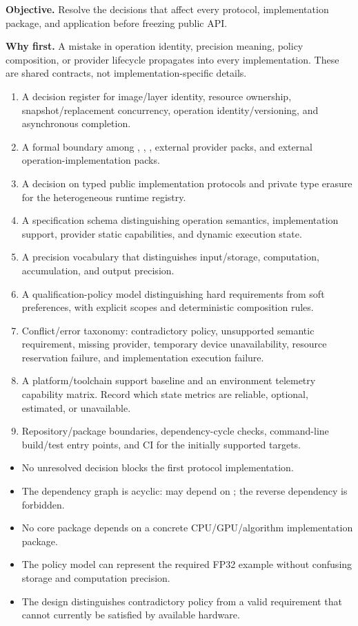 
\textbf{Objective.} Resolve the decisions that affect every protocol, implementation package, and application before freezing public API.

\textbf{Why first.} A mistake in operation identity, precision meaning, policy composition, or provider lifecycle propagates into every implementation. These are shared contracts, not implementation-specific details.

\deliverables
\begin{enumerate}
  \item A decision register for image/layer identity, resource ownership, snapshot/replacement concurrency, operation identity/versioning, and asynchronous completion.
  \item A formal boundary among \IPP{}, \GEP{}, \IPR{}, external provider packs, and external operation-implementation packs.
  \item A decision on typed public implementation protocols and private type erasure for the heterogeneous runtime registry.
  \item A specification schema distinguishing operation semantics, implementation support, provider static capabilities, and dynamic execution state.
  \item A precision vocabulary that distinguishes input/storage, computation, accumulation, and output precision.
  \item A qualification-policy model distinguishing hard requirements from soft preferences, with explicit scopes and deterministic composition rules.
  \item Conflict/error taxonomy: contradictory policy, unsupported semantic requirement, missing provider, temporary device unavailability, resource reservation failure, and implementation execution failure.
  \item A platform/toolchain support baseline and an environment telemetry capability matrix. Record which state metrics are reliable, optional, estimated, or unavailable.
  \item Repository/package boundaries, dependency-cycle checks, command-line build/test entry points, and CI for the initially supported targets.
\end{enumerate}

\exitcriteria
\begin{itemize}
  \item No unresolved decision blocks the first protocol implementation.
  \item The dependency graph is acyclic: \IPP{} may depend on \GEP{}; the reverse dependency is forbidden.
  \item No core package depends on a concrete CPU/GPU/algorithm implementation package.
  \item The policy model can represent the required FP32 example without confusing storage and computation precision.
  \item The design distinguishes contradictory policy from a valid requirement that cannot currently be satisfied by available hardware.
\end{itemize}

